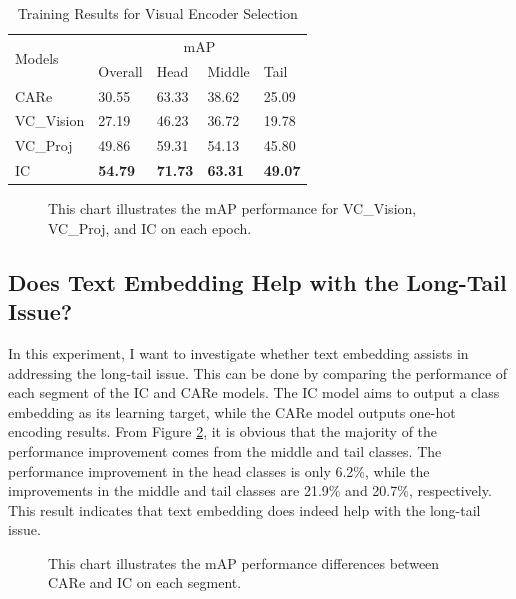 \begin{table}[ht]
    \centering
    \caption{Training Results for Visual Encoder Selection}
    \label{tab:resultsbackbone}
    \begin{tabular}{lllll}
        \toprule
        \multirow{2}{*}{Models} & \multicolumn{4}{c}{mAP} \\
        \cmidrule{2-5} 
        {} & Overall & Head  & Middle & Tail \\
        \midrule
        CARe        & 30.55   & 63.33 & 38.62 & 25.09 \\
        VC\_Vision  & 27.19   & 46.23 & 36.72 & 19.78 \\
        VC\_Proj    & 49.86   & 59.31 & 54.13 & 45.80 \\
        IC          & \textbf{54.79}   & \textbf{71.73} & \textbf{63.31} & \textbf{49.07} \\
        \bottomrule
    \end{tabular}
\end{table}

\begin{figure}[ht]
    \centering
    \resizebox{1.0\textwidth}{!}{}
    \caption[mAP performance for VC\_Vision, VC\_Proj, and IC on each epoch]{This chart illustrates the mAP performance for VC\_Vision, VC\_Proj, and IC on each epoch.}
    \label{fig:tp_backbone}
\end{figure}

\subsection{Does Text Embedding Help with the Long-Tail Issue?}
In this experiment, I want to investigate whether text embedding assists in addressing the long-tail issue. This can be done by comparing the performance of each segment of the IC and CARe models. The IC model aims to output a class embedding as its learning target, while the CARe model outputs one-hot encoding results. From Figure \ref{fig:tp_longtailcomp}, it is obvious that the majority of the performance improvement comes from the middle and tail classes. The performance improvement in the head classes is only 6.2\%, while the improvements in the middle and tail classes are 21.9\% and 20.7\%, respectively. This result indicates that text embedding does indeed help with the long-tail issue. 

\begin{figure}[ht]
    \centering
    \resizebox{1.0\textwidth}{!}{}
    \caption[mAP performance differences between CARe and IC on each segment]{This chart illustrates the mAP performance differences between CARe and IC on each segment.}
    \label{fig:tp_longtailcomp}
\end{figure}

